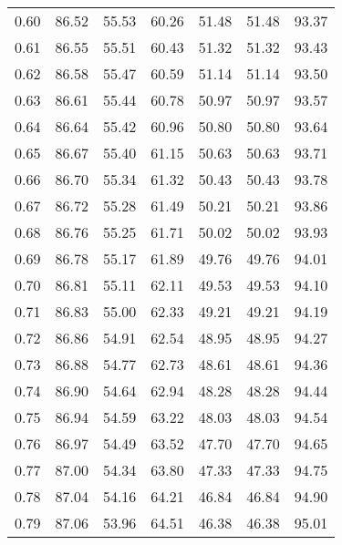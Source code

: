 \begin{tabular}{|c|c|c|c|c|c|c|}
      0.60 &     86.52 &     55.53 &      60.26 &   51.48 &      51.48 &         93.37 \\
      0.61 &     86.55 &     55.51 &      60.43 &   51.32 &      51.32 &         93.43 \\
      0.62 &     86.58 &     55.47 &      60.59 &   51.14 &      51.14 &         93.50 \\
      0.63 &     86.61 &     55.44 &      60.78 &   50.97 &      50.97 &         93.57 \\
      0.64 &     86.64 &     55.42 &      60.96 &   50.80 &      50.80 &         93.64 \\
      0.65 &     86.67 &     55.40 &      61.15 &   50.63 &      50.63 &         93.71 \\
      0.66 &     86.70 &     55.34 &      61.32 &   50.43 &      50.43 &         93.78 \\
      0.67 &     86.72 &     55.28 &      61.49 &   50.21 &      50.21 &         93.86 \\
      0.68 &     86.76 &     55.25 &      61.71 &   50.02 &      50.02 &         93.93 \\
      0.69 &     86.78 &     55.17 &      61.89 &   49.76 &      49.76 &         94.01 \\
      0.70 &     86.81 &     55.11 &      62.11 &   49.53 &      49.53 &         94.10 \\
      0.71 &     86.83 &     55.00 &      62.33 &   49.21 &      49.21 &         94.19 \\
      0.72 &     86.86 &     54.91 &      62.54 &   48.95 &      48.95 &         94.27 \\
      0.73 &     86.88 &     54.77 &      62.73 &   48.61 &      48.61 &         94.36 \\
      0.74 &     86.90 &     54.64 &      62.94 &   48.28 &      48.28 &         94.44 \\
      0.75 &     86.94 &     54.59 &      63.22 &   48.03 &      48.03 &         94.54 \\
      0.76 &     86.97 &     54.49 &      63.52 &   47.70 &      47.70 &         94.65 \\
      0.77 &     87.00 &     54.34 &      63.80 &   47.33 &      47.33 &         94.75 \\
      0.78 &     87.04 &     54.16 &      64.21 &   46.84 &      46.84 &         94.90 \\
      0.79 &     87.06 &     53.96 &      64.51 &   46.38 &      46.38 &         95.01 \\

\end{tabular}
